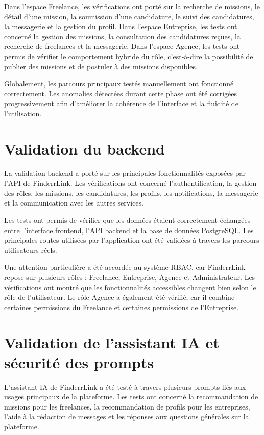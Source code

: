 Dans l'espace Freelance, les vérifications ont porté sur la recherche de missions, le détail d'une mission, la soumission d'une candidature, le suivi des candidatures, la messagerie et la gestion du profil. Dans l'espace Entreprise, les tests ont concerné la gestion des missions, la consultation des candidatures reçues, la recherche de freelances et la messagerie. Dans l'espace Agence, les tests ont permis de vérifier le comportement hybride du rôle, c'est-à-dire la possibilité de publier des missions et de postuler à des missions disponibles.

Globalement, les parcours principaux testés manuellement ont fonctionné correctement. Les anomalies détectées durant cette phase ont été corrigées progressivement afin d'améliorer la cohérence de l'interface et la fluidité de l'utilisation.

\section{Validation du backend}

La validation backend a porté sur les principales fonctionnalités exposées par l'API de FinderrLink. Les vérifications ont concerné l'authentification, la gestion des rôles, les missions, les candidatures, les profils, les notifications, la messagerie et la communication avec les autres services.

Les tests ont permis de vérifier que les données étaient correctement échangées entre l'interface frontend, l'API backend et la base de données PostgreSQL. Les principales routes utilisées par l'application ont été validées à travers les parcours utilisateurs réels.

Une attention particulière a été accordée au système RBAC, car FinderrLink repose sur plusieurs rôles : Freelance, Entreprise, Agence et Administrateur. Les vérifications ont montré que les fonctionnalités accessibles changent bien selon le rôle de l'utilisateur. Le rôle Agence a également été vérifié, car il combine certaines permissions du Freelance et certaines permissions de l'Entreprise.

\section{Validation de l'assistant IA et sécurité des prompts}

L'assistant IA de FinderrLink a été testé à travers plusieurs prompts liés aux usages principaux de la plateforme. Les tests ont concerné la recommandation de missions pour les freelances, la recommandation de profils pour les entreprises, l'aide à la rédaction de messages et les réponses aux questions générales sur la plateforme.

